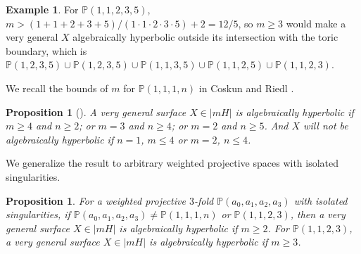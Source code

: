 \documentclass{amsart}
\newtheorem{proposition}[theorem]{Proposition}
\theoremstyle{definition}
\newtheorem{example}[theorem]{Example}
\theoremstyle{remark}
\begin{document}
\begin{example}For $\mathbb P(1,1,2,3,5)
$, $m> (1+1+2+3+5)/(1\cdot1\cdot2\cdot 3\cdot 5) +2 = 12/5$, so $m\geq 3$ would make a very general $X$ algebraically hyperbolic outside its intersection with the toric boundary,  which is $\mathbb P(1,2,3,5)\cup \mathbb P(1,2,3,5)\cup \mathbb P(1,1,3,5)\cup \mathbb P(1,1,2,5)\cup \mathbb P(1,1,2,3)$.
\end{example}

We recall the bounds of $m$ for $\mathbb P(1,1,1,n)$ in Coskun and Riedl \cite{coskun2019algebraichyperbolicitygeneralsurfaces}.

\begin{proposition}
[{\cite[Lemma 3.9, Proposition 3.10]{coskun2019algebraichyperbolicitygeneralsurfaces}}]\label{prop1}
A very general surface $X \in |mH|$ is algebraically hyperbolic if $m \geq 4$ and $n \geq 2$; or $m = 3$ and $n \geq 4$; or $m = 2$ and $n \geq 5$. And $X$ will not be algebraically hyperbolic if $n = 1$, $m\leq4$ or $m = 2$, $n \leq 4$.
\end{proposition}


We generalize the result to arbitrary weighted projective spaces with isolated singularities. 

\begin{proposition}\label{prop3}
For a weighted projective $3$-fold $\mathbb{P}(a_0,a_1,a_2,a_3)$ with isolated singularities, if $\mathbb{P}(a_0,a_1,a_2,a_3) \neq \mathbb{P}(1,1,1,n)$ or $\mathbb{P}(1,1,2,3)$, then a very general surface $X\in |mH|$ is algebraically hyperbolic if $m \geq 2$. For $\mathbb{P}(1,1,2,3)$, a very general surface $X\in|mH|$ is algebraically hyperbolic if $m\geq 3$.
\end{proposition}
\end{document}
